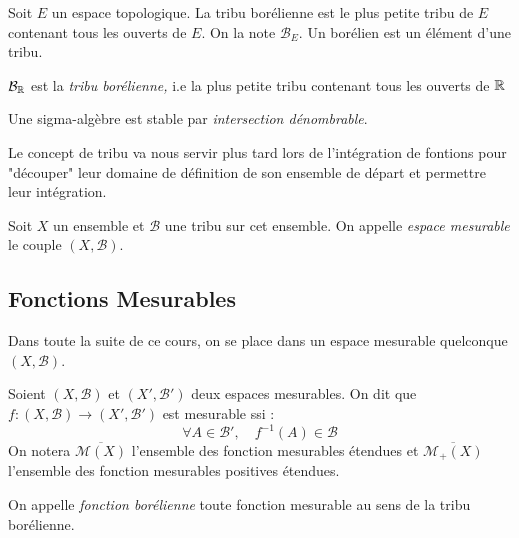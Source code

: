 \begin{definition}
	Soit $E$ un espace topologique. La tribu borélienne est le plus petite tribu de $E$ contenant tous les ouverts de $E$. 
    On la note $\mathcal{B}_E$. Un borélien est un élément d'une tribu. 
\end{definition}

\begin{example} 
	$\mathcal{B}_{\mathbb{R}}$ est la \emph{tribu borélienne,} i.e la plus petite tribu contenant tous les ouverts de $\mathbb{R}$
\end{example} 

\begin{prop}[Intersection]
	Une sigma-algèbre est stable par \emph{intersection dénombrable}.
\end{prop} 

Le concept de tribu va nous servir plus tard lors de l'intégration de fontions pour "découper" leur domaine de 
définition de son ensemble de départ et permettre leur intégration. 

\begin{definition}
    Soit $X$ un ensemble et $ \mathcal{B}$ une tribu sur cet ensemble. 
    On appelle \emph{espace mesurable} le couple $(X, \mathcal{B})$.
\end{definition}

\subsection{Fonctions Mesurables} 

Dans toute la suite de ce cours, on se place dans un espace mesurable quelconque $(X, \mathcal{B})$. 


\begin{definition}
    Soient $(X, \mathcal{B})$ et $(X', \mathcal{B}')$ deux espaces mesurables. 
	On dit que $f : (X,\mathcal{B}) \longrightarrow (X',\mathcal{B}')$ est mesurable ssi :
		\[ \boxed{ \forall A \in \mathcal{B}', \quad f^{-1}(A) \in \mathcal{B} } \]
    On notera $ \overline{\mathcal{M}(X)}$ l'ensemble des fonction mesurables étendues et 
     $ \overline{\mathcal{M}_+(X)}$ l'ensemble des fonction mesurables positives étendues. 
\end{definition}

\begin{remark}
	On appelle \emph{fonction borélienne} toute fonction mesurable au sens de la tribu borélienne. 
\end{remark}

